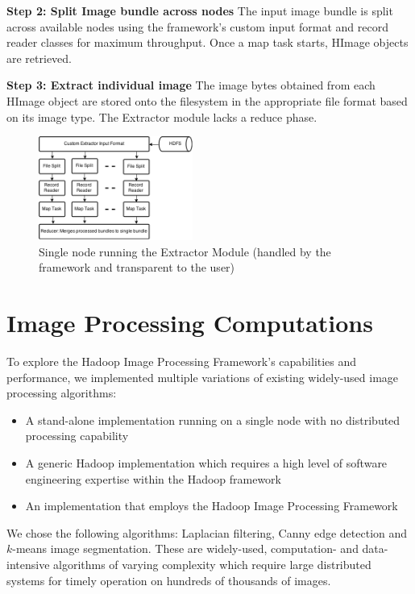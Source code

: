 \documentclass[conference]{IEEEtran}
\begin{document}
\textbf{Step 2: Split Image bundle across nodes} The input image
bundle is split across available nodes using the framework's custom
input format and record reader classes for maximum throughput. Once a
map task starts, HImage objects are retrieved.

\textbf{Step 3: Extract individual image} The image bytes obtained
from each HImage object are stored onto the filesystem in the
appropriate file format based on its image type.  The Extractor module
lacks a reduce phase.

\begin{figure}[h]
  \centering
  \includegraphics[width=0.45\textwidth]{ext-node}
  \caption{Single node running the Extractor Module (handled by the
    framework and transparent to the user)}
  \label{fig:ext-node}
\end{figure}


\section{Image Processing Computations}
To explore the Hadoop Image Processing Framework's capabilities and
performance, we implemented multiple variations of existing
widely-used image processing algorithms:
\begin{itemize}
\item A stand-alone implementation running on a single node with no
  distributed processing capability
\item A generic Hadoop implementation which requires a high level of
  software engineering expertise within the Hadoop framework
\item An implementation that employs the Hadoop Image Processing
  Framework
\end{itemize}

We chose the following algorithms: Laplacian filtering, Canny edge
detection and $k$-means image segmentation.  These are widely-used,
computation- and data-intensive algorithms of varying complexity which
require large distributed systems for timely operation on hundreds of
thousands of images.
\end{document}
